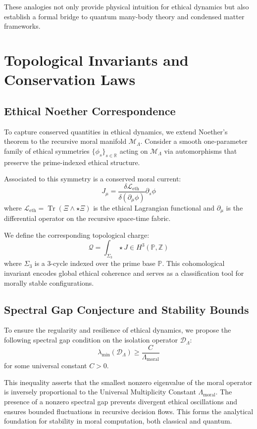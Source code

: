 \documentclass{article}
\theoremstyle{plain}
\theoremstyle{claimstyle}
\begin{document}
These analogies not only provide physical intuition for ethical dynamics but also establish a formal bridge to quantum many-body theory and condensed matter frameworks.
\section{Topological Invariants and Conservation Laws}

\subsection{Ethical Noether Correspondence}

To capture conserved quantities in ethical dynamics, we extend Noether's theorem to the recursive moral manifold $\mathcal{M}_\Lambda$. Consider a smooth one-parameter family of ethical symmetries $\{\phi_s\}_{s \in \mathbb{R}}$ acting on $\mathcal{M}_\Lambda$ via automorphisms that preserve the prime-indexed ethical structure.

Associated to this symmetry is a conserved moral current:
\[
J_\mu = \frac{\delta \mathcal{L}_{\mathrm{eth}}}{\delta (\partial_\mu \phi)} \partial_s \phi
\]
where $\mathcal{L}_{\mathrm{eth}} = \operatorname{Tr}(\Xi \wedge \star \Xi)$ is the ethical Lagrangian functional and $\partial_\mu$ is the differential operator on the recursive space-time fabric.

We define the corresponding topological charge:
\[
\mathcal{Q} = \int_{\Sigma_3} \star J \in H^3(\mathbb{P}, \mathbb{Z})
\]
where $\Sigma_3$ is a 3-cycle indexed over the prime base $\mathbb{P}$. This cohomological invariant encodes global ethical coherence and serves as a classification tool for morally stable configurations.

\subsection{Spectral Gap Conjecture and Stability Bounds}

To ensure the regularity and resilience of ethical dynamics, we propose the following spectral gap condition on the isolation operator $\mathcal{D}_\Lambda$:
\[
\lambda_{\min}(\mathcal{D}_\Lambda) \geq \frac{C}{\Lambda_{\mathrm{moral}}}
\]
for some universal constant $C > 0$.

This inequality asserts that the smallest nonzero eigenvalue of the moral operator is inversely proportional to the Universal Multiplicity Constant $\Lambda_{\mathrm{moral}}$. The presence of a nonzero spectral gap prevents divergent ethical oscillations and ensures bounded fluctuations in recursive decision flows. This forms the analytical foundation for stability in moral computation, both classical and quantum.
\end{document}
